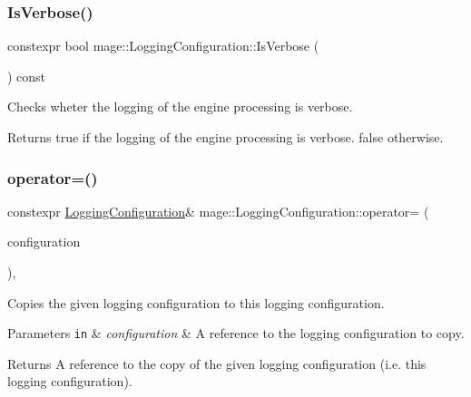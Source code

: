 \subsubsection{\texorpdfstring{Is\+Verbose()}{IsVerbose()}}
{\footnotesize\ttfamily constexpr bool mage\+::\+Logging\+Configuration\+::\+Is\+Verbose (\begin{DoxyParamCaption}{ }\end{DoxyParamCaption}) const\hspace{0.3cm}{\ttfamily [noexcept]}}

Checks wheter the logging of the engine processing is verbose.

\begin{DoxyReturn}{Returns}
{\ttfamily true} if the logging of the engine processing is verbose. {\ttfamily false} otherwise. 
\end{DoxyReturn}
\mbox{\label{classmage_1_1_logging_configuration_a17aa265307f73f3c5f96e35e30c0b437}} 
\subsubsection{\texorpdfstring{operator=()}{operator=()}\hspace{0.1cm}{\footnotesize\ttfamily [1/2]}}
{\footnotesize\ttfamily constexpr \mbox{\hyperlink{classmage_1_1_logging_configuration}{Logging\+Configuration}}\& mage\+::\+Logging\+Configuration\+::operator= (\begin{DoxyParamCaption}\item[{const \mbox{\hyperlink{classmage_1_1_logging_configuration}{Logging\+Configuration}} \&}]{configuration }\end{DoxyParamCaption})\hspace{0.3cm}{\ttfamily [default]}, {\ttfamily [noexcept]}}

Copies the given logging configuration to this logging configuration.


\begin{DoxyParams}[1]{Parameters}
\mbox{\tt in}  & {\em configuration} & A reference to the logging configuration to copy. \\
\hline
\end{DoxyParams}
\begin{DoxyReturn}{Returns}
A reference to the copy of the given logging configuration (i.\+e. this logging configuration). 
\end{DoxyReturn}
\mbox{\label{classmage_1_1_logging_configuration_aeeb70ca4119118f90c7ca4b9cb712f11}} 
